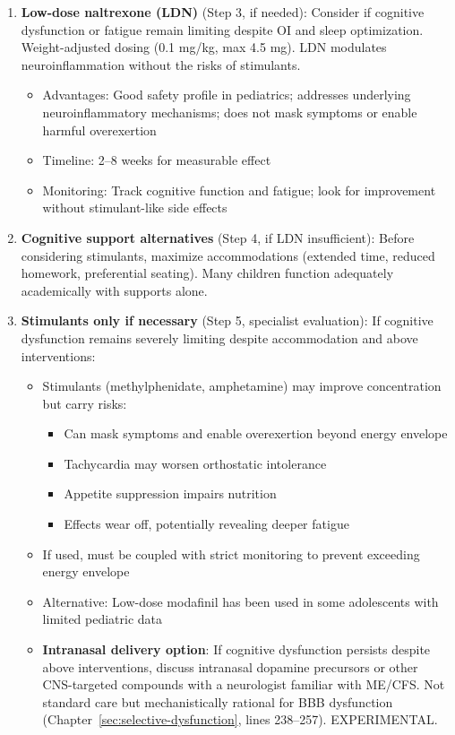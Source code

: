 \begin{protocol}
\begin{enumerate}
    \item \textbf{Low-dose naltrexone (LDN)} (Step 3, if needed): Consider if cognitive dysfunction or fatigue remain limiting despite OI and sleep optimization. Weight-adjusted dosing (0.1 mg/kg, max 4.5 mg). LDN modulates neuroinflammation without the risks of stimulants.
    \begin{itemize}
        \item Advantages: Good safety profile in pediatrics; addresses underlying neuroinflammatory mechanisms; does not mask symptoms or enable harmful overexertion
        \item Timeline: 2--8 weeks for measurable effect
        \item Monitoring: Track cognitive function and fatigue; look for improvement without stimulant-like side effects
    \end{itemize}

    \item \textbf{Cognitive support alternatives} (Step 4, if LDN insufficient): Before considering stimulants, maximize accommodations (extended time, reduced homework, preferential seating). Many children function adequately academically with supports alone.

    \item \textbf{Stimulants only if necessary} (Step 5, specialist evaluation): If cognitive dysfunction remains severely limiting despite accommodation and above interventions:
    \begin{itemize}
        \item Stimulants (methylphenidate, amphetamine) may improve concentration but carry risks:
        \begin{itemize}
            \item Can mask symptoms and enable overexertion beyond energy envelope
            \item Tachycardia may worsen orthostatic intolerance
            \item Appetite suppression impairs nutrition
            \item Effects wear off, potentially revealing deeper fatigue
        \end{itemize}
        \item If used, must be coupled with strict monitoring to prevent exceeding energy envelope
        \item Alternative: Low-dose modafinil has been used in some adolescents with limited pediatric data
        \item \textbf{Intranasal delivery option}: If cognitive dysfunction persists despite above interventions, discuss intranasal dopamine precursors or other CNS-targeted compounds with a neurologist familiar with ME/CFS. Not standard care but mechanistically rational for BBB dysfunction (Chapter~\ref{sec:selective-dysfunction}, lines 238--257). EXPERIMENTAL.
    \end{itemize}
\end{enumerate}


\end{protocol}
